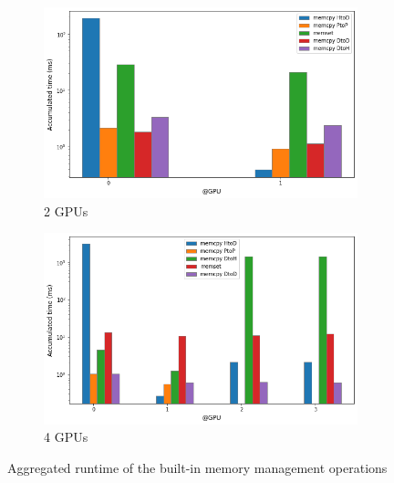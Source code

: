 \begin{figure}[htbp]
    \centering
    \begin{subfigure}{.5\textwidth}
      \centering
      \includegraphics[width=\linewidth]{fig/gpt2/men_2gpu.png}
      \caption{2 GPUs}
      \label{fig:sub1}
    \end{subfigure}%
    \begin{subfigure}{.5\textwidth}
      \centering
      \includegraphics[width=\linewidth]{fig/gpt2/men_4gpu.png}
      \caption{4 GPUs}
      \label{fig:sub2}
    \end{subfigure}
    \caption{Aggregated runtime of the built-in memory management operations}
\label{fig:gpt2:mem}
\end{figure}

